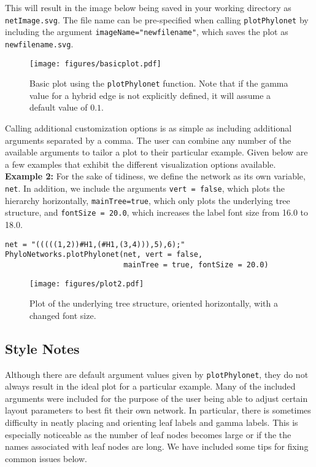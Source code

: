 \documentclass[12pt]{article}
\begin{document}
This will result in the image below being saved in your working directory as \texttt{netImage.svg}.
The file name can be pre-specified when calling \texttt{plotPhylonet} by including the argument \texttt{imageName="newfilename"}, which saves the plot as \texttt{newfilename.svg}.

\begin{figure}[htbp]
  \begin{center}
    \texttt{[image: figures/basicplot.pdf]} \quad
    \caption{Basic plot using the \texttt{plotPhylonet} function. Note that if the gamma value for a hybrid edge is not explicitly defined, it will assume a default value of $0.1$.}
    \label{BasicPlot}
  \end{center}
\end{figure}

\noindent Calling additional customization options is as simple as including additional arguments separated by a comma.
The user can combine any number of the available arguments to tailor a plot to their particular example.
Given below are a few examples that exhibit the different visualization options available. \\

\noindent \textbf{Example 2:} For the sake of tidiness, we define the network  as its own variable, \texttt{net}.
In addition, we include the arguments \texttt{vert = false}, which plots the hierarchy horizontally,
\texttt{mainTree=true}, which only plots the underlying tree structure, and
\texttt{fontSize = 20.0}, which increases the label font size from 16.0 to 18.0. \\

\begin{lstlisting}
net = "(((((1,2))#H1,(#H1,(3,4))),5),6);"
PhyloNetworks.plotPhylonet(net, vert = false,
                           mainTree = true, fontSize = 20.0)
\end{lstlisting}

\begin{figure}[htbp]
  \begin{center}
    \texttt{[image: figures/plot2.pdf]} \quad
    \caption{Plot of the underlying tree structure, oriented horizontally, with a changed font size.}
    \label{BasicPlot}
  \end{center}
\end{figure}


\subsection{Style Notes}
Although there are default argument values given by \texttt{plotPhylonet}, they do not always result in the ideal plot for a particular example.
Many of the included arguments were included for the purpose of the user being able to adjust certain layout parameters to best fit their own network.
In particular, there is sometimes difficulty in neatly placing and orienting leaf labels and gamma labels.
This is especially noticeable as the number of leaf nodes becomes large or if the the names associated with leaf nodes are long.
We have included some tips for fixing common issues below.
\end{document}
